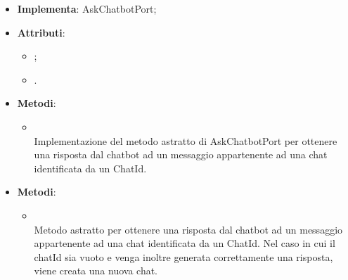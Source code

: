 \documentclass[10pt, a4paper]{article}
\begin{document}
\label{AskChatbotLangchainDettaglio}
\begin{itemize}
    \item \textbf{Implementa}: AskChatbotPort;
    \item \textbf{Attributi}:
    \begin{itemize}
        \item {};
        \item {}.
    \end{itemize}
    \item \textbf{Metodi}:
    \begin{itemize}
        \item {}\\
        Implementazione del metodo astratto di AskChatbotPort per ottenere una risposta dal chatbot ad un messaggio appartenente ad una chat identificata da un ChatId. %

      
    \end{itemize}
\end{itemize}

\label{AskChatbotPortDettaglio}
\begin{itemize}
    \item \textbf{Metodi}:
    \begin{itemize}
        \item {}\\
        Metodo astratto per ottenere una risposta dal chatbot ad un messaggio appartenente ad una chat identificata da un ChatId. Nel caso in cui il chatId sia vuoto e venga inoltre generata correttamente una risposta, viene creata una nuova chat.
    \end{itemize}
\end{itemize}
\end{document}
